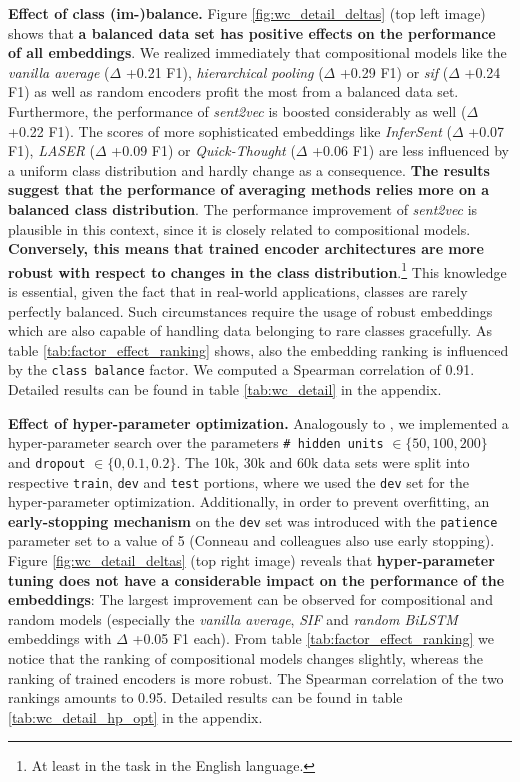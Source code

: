  \textbf{Effect of class (im-)balance.} Figure \vref{fig:wc_detail_deltas} (top left image) shows that \textbf{a balanced data set has positive effects on the performance of all embeddings}. We realized immediately that compositional models like the \textit{vanilla average} ($\Delta$ +0.21 F1), \textit{hierarchical pooling} ($\Delta$ +0.29 F1) or \textit{\gls{sif}} ($\Delta$ +0.24 F1) as well as random encoders profit the most from a balanced data set. Furthermore, the performance of \textit{sent2vec} is boosted considerably as well ($\Delta$ +0.22 F1). The scores of more sophisticated embeddings like \textit{InferSent} ($\Delta$ +0.07 F1), \textit{LASER} ($\Delta$ +0.09 F1) or \textit{Quick-Thought} ($\Delta$ +0.06 F1) are less influenced by a uniform class distribution and hardly change as a consequence. \textbf{The results suggest that the performance of averaging methods relies more on a balanced class distribution}. The performance improvement of \textit{sent2vec} is plausible in this context, since it is closely related to compositional models. \textbf{Conversely, this means that trained encoder architectures are more robust with respect to changes in the class distribution}.\footnote{At least in the  task in the English language.} This knowledge is essential, given the fact that in real-world applications, classes are rarely perfectly balanced. Such circumstances require the usage of robust embeddings which are also capable of handling data belonging to rare classes gracefully. As table \vref{tab:factor_effect_ranking} shows, also the embedding ranking is influenced by the \texttt{class balance} factor. We computed a Spearman correlation of 0.91. Detailed results can be found in table \vref{tab:wc_detail} in the appendix.

 \textbf{Effect of hyper-parameter optimization.} Analogously to \citep{Conneau.2018a}, we implemented a hyper-parameter search over the parameters \texttt{\# hidden units} $\in \{ 50, 100, 200 \}$ and \texttt{dropout} $\in \{0, 0.1, 0.2 \}$. The 10k, 30k and 60k data sets were split into respective \texttt{train}, \texttt{dev} and \texttt{test} portions, where we used the \texttt{dev} set for the hyper-parameter optimization. Additionally, in order to prevent overfitting, an \textbf{early-stopping mechanism} on the \texttt{dev} set was introduced with the \texttt{patience} parameter set to a value of 5 (Conneau and colleagues also use early stopping). Figure \vref{fig:wc_detail_deltas} (top right image) reveals that \textbf{hyper-parameter tuning does not have a considerable impact on the performance of the embeddings}: The largest improvement can be observed for compositional and random models (especially the \textit{vanilla average}, \textit{SIF} and \textit{random BiLSTM} embeddings with $\Delta$ +0.05 F1 each). From table \vref{tab:factor_effect_ranking} we notice that the ranking of compositional models changes slightly, whereas the ranking of trained encoders is more robust. The Spearman correlation of the two rankings amounts to 0.95. Detailed results can be found in table \vref{tab:wc_detail_hp_opt} in the appendix.

